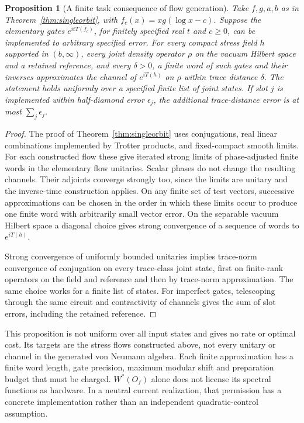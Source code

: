 \documentclass[12pt]{article}
\newtheorem{proposition}[theorem]{Proposition}
\theoremstyle{definition}
\theoremstyle{remark}
\begin{document}
\begin{proposition}[A finite task consequence of flow generation]\label{prop:finitewords}
Take \(f,g,a,b\) as in Theorem~\ref{thm:singleorbit}, with
\(f_c(x)=xg(\log x-c)\).
Suppose the elementary gates \(e^{itT(f_c)}\), for finitely specified real
\(t\) and \(c\ge0\), can be implemented to arbitrary specified error.
For every compact stress field \(h\) supported in \((b,\infty)\), every
joint density operator \(\rho\) on the vacuum Hilbert space and a retained reference, and
every \(\delta>0\), a finite word of such gates and their inverses approximates
the channel of \(e^{iT(h)}\) on \(\rho\) within trace distance \(\delta\).
The statement holds uniformly over a specified finite list of joint states.
If slot \(j\) is implemented within half-diamond error \(\epsilon_j\), the
additional trace-distance error is at most \(\sum_j\epsilon_j\).
\end{proposition}
\begin{proof}
The proof of Theorem~\ref{thm:singleorbit} uses conjugations, real linear
combinations implemented by Trotter products, and fixed-compact smooth limits.
For each constructed flow these give iterated strong limits of phase-adjusted
finite words in the elementary flow unitaries. Scalar phases do not change
the resulting channels. Their adjoints converge strongly too, since the
limits are unitary and the inverse-time construction applies.
On any finite set of test vectors, successive approximations can be chosen
in the order in which these limits occur to produce one finite word with
arbitrarily small vector error. On the separable vacuum Hilbert space a
diagonal choice gives strong convergence of a sequence of words to
\(e^{iT(h)}\).

Strong convergence of uniformly bounded unitaries implies trace-norm
convergence of conjugation on every trace-class joint state, first on
finite-rank operators on the field and reference and then by trace-norm
approximation. The same choice works for a finite list of states.
For imperfect gates, telescoping through the same circuit and contractivity
of channels gives the sum of slot errors, including the retained reference.
\end{proof}

This proposition is not uniform over all input states and gives no rate or
optimal cost. Its targets are the stress flows constructed above, not every
unitary or channel in the generated von Neumann algebra. Each finite
approximation has a finite word length, gate
precision, maximum modular shift and preparation budget that must be charged.
\(W^*(O_f)\) alone does not license its spectral functions as hardware.
In a neutral current realization, that permission has a concrete
implementation rather than an independent quadratic-control assumption.
\end{document}

